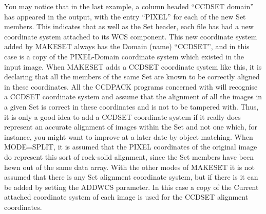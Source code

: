 \documentclass[twoside,11pt]{article}
\renewcommand{\_}{\texttt{\symbol{95}}}
\newcommand{\routine}[1]{{\sc #1}}
\begin{document}
You may notice that in the last example, 
a column headed ``CCD\_SET domain'' has appeared in the output,
with the entry ``PIXEL'' for each of the new Set members.
This indicates that as well as the Set header, each file has
had a new coordinate system attached to its WCS component.
This new coordinate system added by \routine{MAKESET}
always has the Domain (name) ``CCD\_SET'', 
and in this case is a copy of the 
PIXEL-Domain coordinate system which existed
in the input image.
When \routine{MAKESET} adds a CCD\_SET coordinate system like this,
it is declaring that all the members of the same Set are known to
be correctly aligned in these coordinates.
All the CCDPACK programs concerned with 
will recognise a CCD\_SET coordinate system and assume that 
the alignment of all the images in a given Set is correct in
these coordinates and is not to be tampered with.
Thus, it is only a good idea to add a CCD\_SET coordinate system
if it really does represent an accurate alignment of images within
the Set and not one which, for instance, you might want to improve
at a later date by object matching.
When MODE=SPLIT, it is assumed that the PIXEL coordinates of
the original image do
represent this sort of rock-solid alignment, 
since the Set members have been hewn out of the same data array.
With the other modes of \routine{MAKESET} it is not assumed that
there is any Set alignment coordinate system, but if there is
it can be added by setting the ADDWCS parameter.  In this case
a copy of the Current attached coordinate system of each image
is used for the CCD\_SET alignment coordinates.
\end{document}
